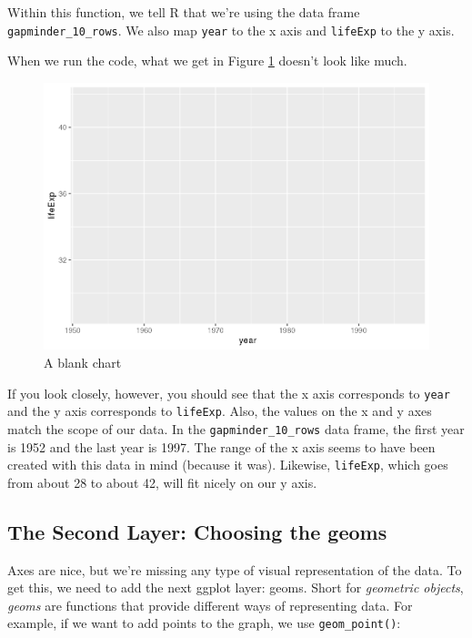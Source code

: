 \documentclass[
]{book}
\begin{document}
Within this function, we tell R that we're using the data frame \texttt{gapminder\_10\_rows}. We also map \texttt{year} to the x axis and \texttt{lifeExp} to the y axis.

When we run the code, what we get in Figure \ref{fig:blank-ggplot} doesn't look like much.

\begin{figure}
\includegraphics[width=1\linewidth]{data-viz_files/figure-latex/blank-ggplot-1} \caption{A blank chart}\label{fig:blank-ggplot}
\end{figure}

If you look closely, however, you should see that the x axis corresponds to \texttt{year} and the y axis corresponds to \texttt{lifeExp}. Also, the values on the x and y axes match the scope of our data. In the \texttt{gapminder\_10\_rows} data frame, the first year is 1952 and the last year is 1997. The range of the x axis seems to have been created with this data in mind (because it was). Likewise, \texttt{lifeExp}, which goes from about 28 to about 42, will fit nicely on our y axis.

\hypertarget{the-second-layer-choosing-the-geoms}{%
\subsection*{The Second Layer: Choosing the geoms}\label{the-second-layer-choosing-the-geoms}}

Axes are nice, but we're missing any type of visual representation of the data. To get this, we need to add the next ggplot layer: geoms. Short for \emph{geometric objects}, \emph{geoms} are functions that provide different ways of representing data. For example, if we want to add points to the graph, we use \texttt{geom\_point()}:
\end{document}
